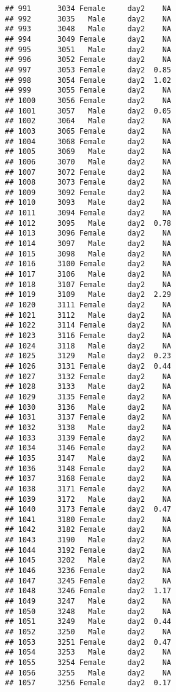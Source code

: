 \documentclass[
]{article}
\begin{document}
\begin{verbatim}
## 991      3034 Female     day2    NA
## 992      3035   Male     day2    NA
## 993      3048   Male     day2    NA
## 994      3049 Female     day2    NA
## 995      3051   Male     day2    NA
## 996      3052 Female     day2    NA
## 997      3053 Female     day2  0.85
## 998      3054 Female     day2  1.02
## 999      3055 Female     day2    NA
## 1000     3056 Female     day2    NA
## 1001     3057   Male     day2  0.05
## 1002     3064   Male     day2    NA
## 1003     3065 Female     day2    NA
## 1004     3068 Female     day2    NA
## 1005     3069   Male     day2    NA
## 1006     3070   Male     day2    NA
## 1007     3072 Female     day2    NA
## 1008     3073 Female     day2    NA
## 1009     3092 Female     day2    NA
## 1010     3093   Male     day2    NA
## 1011     3094 Female     day2    NA
## 1012     3095   Male     day2  0.78
## 1013     3096 Female     day2    NA
## 1014     3097   Male     day2    NA
## 1015     3098   Male     day2    NA
## 1016     3100 Female     day2    NA
## 1017     3106   Male     day2    NA
## 1018     3107 Female     day2    NA
## 1019     3109   Male     day2  2.29
## 1020     3111 Female     day2    NA
## 1021     3112   Male     day2    NA
## 1022     3114 Female     day2    NA
## 1023     3116 Female     day2    NA
## 1024     3118   Male     day2    NA
## 1025     3129   Male     day2  0.23
## 1026     3131 Female     day2  0.44
## 1027     3132 Female     day2    NA
## 1028     3133   Male     day2    NA
## 1029     3135 Female     day2    NA
## 1030     3136   Male     day2    NA
## 1031     3137 Female     day2    NA
## 1032     3138   Male     day2    NA
## 1033     3139 Female     day2    NA
## 1034     3146 Female     day2    NA
## 1035     3147   Male     day2    NA
## 1036     3148 Female     day2    NA
## 1037     3168 Female     day2    NA
## 1038     3171 Female     day2    NA
## 1039     3172   Male     day2    NA
## 1040     3173 Female     day2  0.47
## 1041     3180 Female     day2    NA
## 1042     3182 Female     day2    NA
## 1043     3190   Male     day2    NA
## 1044     3192 Female     day2    NA
## 1045     3202   Male     day2    NA
## 1046     3236 Female     day2    NA
## 1047     3245 Female     day2    NA
## 1048     3246 Female     day2  1.17
## 1049     3247   Male     day2    NA
## 1050     3248   Male     day2    NA
## 1051     3249   Male     day2  0.44
## 1052     3250   Male     day2    NA
## 1053     3251 Female     day2  0.47
## 1054     3253   Male     day2    NA
## 1055     3254 Female     day2    NA
## 1056     3255   Male     day2    NA
## 1057     3256 Female     day2  0.17

\end{verbatim}
\end{document}

